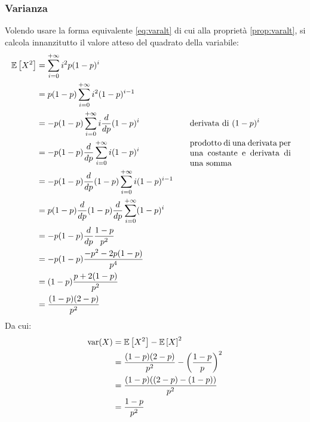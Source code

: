 \subsubsection{Varianza}
Volendo usare la forma equivalente \eqref{eq:varalt} di cui alla proprietà \ref{prop:varalt}, si calcola innanzitutto il valore atteso del quadrato della variabile:
\begin{align*}
	\ev{X^2} & = \sum_{i=0}^{+\infty} i^2 p(1-p)^i                                                                                                          \\
	         & = p(1-p) \sum_{i=0}^{+\infty} i^2 (1-p)^{i-1}                                                                                                \\
	         & = -p(1-p) \sum_{i=0}^{+\infty} i \frac{d}{dp}(1-p)^i \bc{derivata di $(1-p)^i$}                                                              \\
	         & = -p(1-p) \frac{d}{dp}\sum_{i=0}^{+\infty} i (1-p)^i \bc{\parbox{42.5mm}{prodotto di una derivata per una costante e derivata di una somma}} \\
	         & = -p(1-p) \frac{d}{dp}(1-p)\sum_{i=0}^{+\infty} i (1-p)^{i-1}                                                                                \\
	         & = p(1-p) \frac{d}{dp}(1-p) \frac{d}{dp} \sum_{i=0}^{+\infty} (1-p)^i                                                                         \\
	         & = -p(1-p) \frac{d}{dp} \frac{1-p}{p^2}                                                                                                       \\
	         & = -p(1-p) \frac{-p^2-2p(1-p)}{p^4}                                                                                                           \\
	         & = (1-p) \frac{p+2(1-p)}{p^2}                                                                                                                 \\
	         & = \frac{(1-p)(2-p)}{p^2}
\end{align*}
Da cui:
\begin{align*}
	\operatorname{var}(X) & = \mathbb{E}\left[ X^2 \right]-\mathbb{E}\left[ X \right]^2                                     \\
	        & = \frac{(1-p)(2-p)}{p^2} - \left(\frac{1-p}{p}\right)^2 \\
	        & = \frac{(1-p)((2-p)-(1-p))}{p^2}                        \\
	        & = \frac{1-p}{p^2}
\end{align*}


